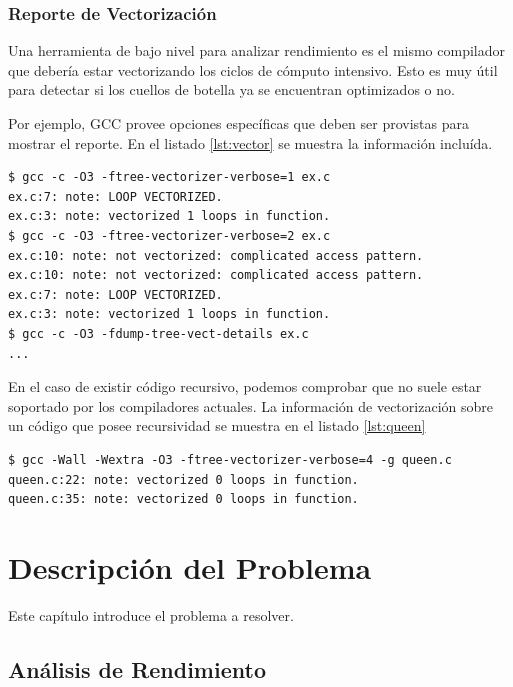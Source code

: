 \documentclass[a4paper]{report}
\begin{document}
\subsection{Reporte de Vectorización}

Una herramienta de bajo nivel para analizar rendimiento es el mismo compilador que debería estar vectorizando los ciclos de cómputo intensivo. Esto es muy
útil para detectar si los cuellos de botella ya se encuentran optimizados o no.

\bigskip

Por ejemplo, GCC provee opciones específicas que deben ser provistas para mostrar el reporte.
En el listado \ref{lst:vector} se muestra la información incluída.

\begin{lstlisting}[caption={Información de Vectorización},label={lst:vector}] 
$ gcc -c -O3 -ftree-vectorizer-verbose=1 ex.c
ex.c:7: note: LOOP VECTORIZED.
ex.c:3: note: vectorized 1 loops in function.
$ gcc -c -O3 -ftree-vectorizer-verbose=2 ex.c
ex.c:10: note: not vectorized: complicated access pattern.
ex.c:10: note: not vectorized: complicated access pattern.
ex.c:7: note: LOOP VECTORIZED.
ex.c:3: note: vectorized 1 loops in function.
$ gcc -c -O3 -fdump-tree-vect-details ex.c
...
\end{lstlisting}

En el caso de existir código recursivo, podemos comprobar que no suele estar soportado por los compiladores actuales.
La información de vectorización sobre un código que posee recursividad se muestra en el listado \ref{lst:queen}

\begin{lstlisting}[caption={Vectorización de Código Recursivo},label={lst:queen}]
$ gcc -Wall -Wextra -O3 -ftree-vectorizer-verbose=4 -g queen.c
queen.c:22: note: vectorized 0 loops in function.
queen.c:35: note: vectorized 0 loops in function.
\end{lstlisting}

\chapter{Descripción del Problema} \label{Descripcion del Problema}

Este capítulo introduce el problema a resolver.

\section{Análisis de Rendimiento}
\end{document}
